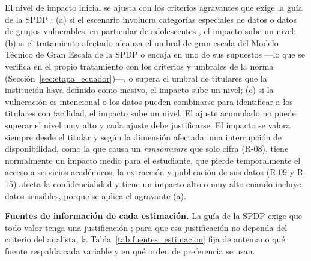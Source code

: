 El nivel de impacto inicial se ajusta con los criterios agravantes que exige la guía de la SPDP \cite{spdp2026guiav2}: (a) si el escenario involucra categorías especiales de datos o datos de grupos vulnerables, en particular de adolescentes \cite[art.~25]{lopdp2021}, el impacto sube un nivel; (b) si el tratamiento afectado alcanza el umbral de gran escala del Modelo Técnico de Gran Escala de la SPDP o encaja en uno de sus supuestos \cite{spdp2026granescala} ---lo que se verifica en el propio tratamiento con los criterios y umbrales de la norma (Sección~\ref{sec:etapa_ecuador})---, o supera el umbral de titulares que la institución haya definido como masivo, el impacto sube un nivel; (c) si la vulneración es intencional o los datos pueden combinarse para identificar a los titulares con facilidad, el impacto sube un nivel. El ajuste acumulado no puede superar el nivel muy alto y cada ajuste debe justificarse. El impacto se valora siempre desde el titular y según la dimensión afectada: una interrupción de disponibilidad, como la que causa un \textit{ransomware} que solo cifra (R-08), tiene normalmente un impacto medio para el estudiante, que pierde temporalmente el acceso a servicios académicos; la extracción y publicación de sus datos (R-09 y R-15) afecta la confidencialidad y tiene un impacto alto o muy alto cuando incluye datos sensibles, porque se aplica el agravante (a).

\textbf{Fuentes de información de cada estimación.} La guía de la SPDP exige que todo valor tenga una justificación \cite{spdp2026guiav2}; para que esa justificación no dependa del criterio del analista, la Tabla~\ref{tab:fuentes_estimacion} fija de antemano qué fuente respalda cada variable y en qué orden de preferencia se usan.

